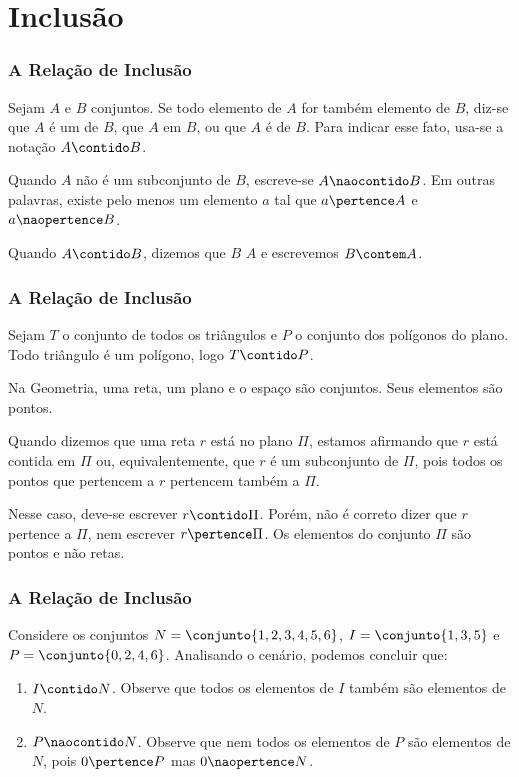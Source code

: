 \section{Inclusão}


\begin{frame}
	\frametitle{A Relação de Inclusão}

	\begin{definicao}
		Sejam $A$ e $B$ conjuntos. Se todo elemento de $A$ for também elemento de $B$, diz-se que $A$ é um  de $B$, que $A$  em $B$, ou que $A$ é  de $B$. Para indicar esse fato, usa-se a notação $A \contido B$.
	\end{definicao}

	Quando $A$ não é um subconjunto de $B$, escreve-se $A \naocontido B$. Em outras palavras, existe pelo menos um elemento $a$ tal que $a \pertence A$ e $a \naopertence B$.

	Quando $A \contido B$, dizemos que $B$  $A$ e escrevemos $B \contem A$.
\end{frame}


\begin{frame}
	\frametitle{A Relação de Inclusão} 

	\begin{exemplo}
		Sejam $T$ o conjunto de todos os triângulos e $P$ o conjunto dos polígonos do plano. Todo triângulo é um polígono, logo $ T \contido P$.
	\end{exemplo}\pause

	\begin{exemplo}\label{exem:subconjuntosdoplano}
		Na Geometria, uma reta, um plano e o espaço são conjuntos. Seus elementos são pontos.

		Quando dizemos que uma reta $r$ está no plano $\Pi$, estamos afirmando que $r$ está contida em $\Pi$ ou, equivalentemente, que $r$ é um subconjunto de $\Pi$, pois todos os pontos que pertencem a $r$ pertencem também a $\Pi$.

		Nesse caso, deve-se escrever $ r \contido \Pi$. Porém, não é correto dizer que $r$ pertence a $\Pi$, nem escrever $r \pertence \Pi$. Os elementos do conjunto $\Pi$ são pontos e não retas.
	\end{exemplo}
\end{frame}


\begin{frame}
	\frametitle{A Relação de Inclusão} 

	\begin{exemplo}
		Considere os conjuntos $N = \conjunto{1, 2, 3, 4, 5, 6}$, $I = \conjunto{1, 3, 5}$ e $P = \conjunto{0, 2, 4, 6}$. Analisando o cenário, podemos concluir que:
	\begin{enumerate}
		\item $I \contido N$. Observe que todos os elementos de $I$ também são elementos de $N$.
		\item $P \naocontido N$. Observe que nem todos os elementos de $P$ são elementos de $N$, pois $0 \pertence P$ mas $0 \naopertence N$.
	\end{enumerate}
	\end{exemplo}

\end{frame}


